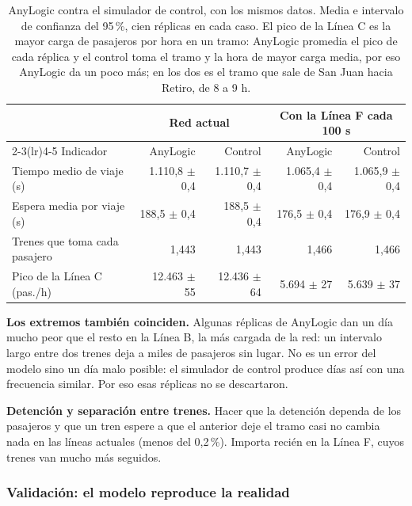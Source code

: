 \documentclass{article}
\begin{document}
\begin{table}[htbp]
  \centering\small
  \caption{AnyLogic contra el simulador de control, con los mismos datos. Media e intervalo de confianza del
  95\,\%, cien réplicas en cada caso. El pico de la Línea C es la mayor carga de pasajeros por hora en un
  tramo: AnyLogic promedia el pico de cada réplica y el control toma el tramo y la hora de mayor carga
  media, por eso AnyLogic da un poco más; en los dos es el tramo que sale de San Juan hacia Retiro, de 8 a 9 h.}
  \label{tab:cruzada}
  \begin{tabular}{lrrrr}
    \toprule
    & \multicolumn{2}{c}{Red actual} & \multicolumn{2}{c}{Con la Línea F cada 100 s} \\
    \cmidrule(lr){2-3}\cmidrule(lr){4-5}
    Indicador & AnyLogic & Control & AnyLogic & Control \\
    \midrule
    Tiempo medio de viaje (s) & 1.110,8 $\pm$ 0,4 & 1.110,7 $\pm$ 0,4 & 1.065,4 $\pm$ 0,4 & 1.065,9 $\pm$ 0,4 \\
    Espera media por viaje (s) & 188,5 $\pm$ 0,4 & 188,5 $\pm$ 0,4 & 176,5 $\pm$ 0,4 & 176,9 $\pm$ 0,4 \\
    Trenes que toma cada pasajero & 1,443 & 1,443 & 1,466 & 1,466 \\
    Pico de la Línea C (pas./h) & 12.463 $\pm$ 55 & 12.436 $\pm$ 64 & 5.694 $\pm$ 27 & 5.639 $\pm$ 37 \\
    \bottomrule
  \end{tabular}
\end{table}

\textbf{Los extremos también coinciden.} Algunas réplicas de AnyLogic dan un día mucho peor que el resto en la
Línea B, la más cargada de la red: un intervalo largo entre dos trenes deja a miles de pasajeros sin lugar.
No es un error del modelo sino un día malo posible: el simulador de control produce días así con una frecuencia
similar. Por eso esas réplicas no se descartaron.

\textbf{Detención y separación entre trenes.} Hacer que la detención dependa de los pasajeros y que un tren
espere a que el anterior deje el tramo casi no cambia nada en las líneas actuales (menos del 0,2\,\%). Importa
recién en la Línea F, cuyos trenes van mucho más seguidos.

\subsubsection{Validación: el modelo reproduce la realidad}
\end{document}
